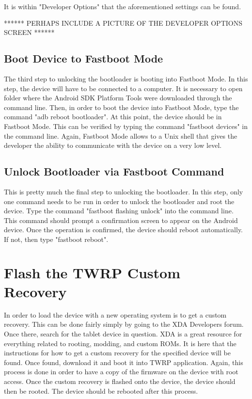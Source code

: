 It is within "Developer Options" that the aforementioned settings can be found.

****** PERHAPS INCLUDE A PICTURE OF THE DEVELOPER OPTIONS SCREEN ******

\subsection{Boot Device to Fastboot Mode}
The third step to unlocking the bootloader is booting into Fastboot Mode. In this step, the device will have to be connected to a computer. It is necessary to 
open folder where the Android SDK Platform Tools were downloaded through the command line. Then, in order to boot the device into Fastboot Mode, type the command
"adb reboot bootloader". At this point, the device should be in Fastboot Mode. This can be verified by typing the command "fastboot devices" in the command line.
Again, Fastboot Mode allows to a Unix shell that gives the developer the ability to communicate with the device on a very low level.

\subsection{Unlock Bootloader via Fastboot Command}
This is pretty much the final step to unlocking the bootloader. In this step, only one command needs to be run in order to unlock the bootloader and root the device. 
Type the command "fastboot flashing unlock" into the command line. This command should prompt a confirmation screen to appear on the Android device. 
Once the operation is confirmed, the device should reboot automatically. If not, then type "fastboot reboot".

\section{Flash the TWRP Custom Recovery}
In order to load the device with a new operating system is to get a custom recovery. This can be done fairly simply by going to the XDA Developers forum. 
Once there, search for the tablet device in question. XDA is a great resource for everything related to rooting, modding, and custom ROMs. It is here that 
the instructions for how to get a custom recovery for the specified device will be found. Once found, download it and boot it into TWRP application. Again, 
this process is done in order to have a copy of the firmware on the device with root access. Once the custom recovery is flashed onto the device, the device should 
then be rooted. The device should be rebooted after this process.


